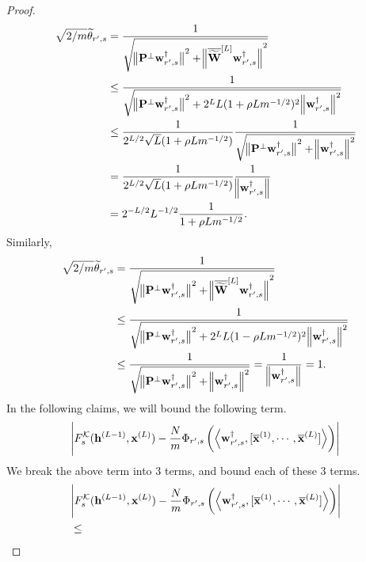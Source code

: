 \begin{claim}
\begin{proof}
				\begin{align}
					\sqrt{2/m} \widetilde{\theta}_{r', s} &= \frac{1}{\sqrt{ \norm[1]{\mathbf{P}^{\perp}\mathbf{w}_{r', s}^{\dagger}}^2 + \norm[2]{\overline{\widetilde{\mathbf{W}}}^{[L]} \mathbf{w}_{r', s}^{\dagger}}^2 }}\nonumber\\&
					\le \frac{1}{\sqrt{  \norm[1]{\mathbf{P}^{\perp}\mathbf{w}_{r', s}^{\dagger}}^2 + 2^{L} L (1 + \rho L m^{-1/2})^2\norm[2]{ \mathbf{w}_{r', s}^{\dagger}}^2 }} \nonumber\\&
					\le \frac{1}{2^{L/2} \sqrt{L} (1 + \rho L m^{-1/2})} \frac{1}{\sqrt{  \norm[1]{\mathbf{P}^{\perp}\mathbf{w}_{r', s}^{\dagger}}^2 + \norm[2]{ \mathbf{w}_{r', s}^{\dagger}}^2 }} \nonumber \\&
					=  \frac{1}{2^{L/2} \sqrt{L} (1 + \rho L m^{-1/2})} \frac{1}{\norm{\mathbf{w}_{r', s}^{\dagger}}} \nonumber\\&
					= 2^{-L/2} L^{-1/2} \frac{1}{1 + \rho L m^{-1/2}} \label{eq:abstildetheta_lowerbound}.
				\end{align}
				Similarly,
				\begingroup
				\allowdisplaybreaks
				\begin{align}
					\sqrt{2/m} \widetilde{\theta}_{r', s} &= \frac{1}{\sqrt{ \norm[1]{\mathbf{P}^{\perp}\mathbf{w}_{r', s}^{\dagger}}^2 + \norm[2]{\overline{\widetilde{\mathbf{W}}}^{[L]} \mathbf{w}_{r', s}^{\dagger}}^2 }}\nonumber\\&
					\le \frac{1}{\sqrt{  \norm[1]{\mathbf{P}^{\perp}\mathbf{w}_{r', s}^{\dagger}}^2 + 2^{L} L (1 - \rho L m^{-1/2})^2\norm[2]{ \mathbf{w}_{r', s}^{\dagger}}^2 }} \nonumber\\&
					\le  \frac{1}{\sqrt{  \norm[1]{\mathbf{P}^{\perp}\mathbf{w}_{r', s}^{\dagger}}^2 + \norm[2]{ \mathbf{w}_{r', s}^{\dagger}}^2 }} 
					=   \frac{1}{\norm{\mathbf{w}_{r', s}^{\dagger}}}
					= 1. \label{eq:abstildetheta_upperbound}
				\end{align}
				\endgroup
				In the following claims, we will bound the following term.
				\begin{align*}
					\abs{F^{\mathcal{K}}_s(\mathbf{h}^{(L-1)}, \mathbf{x}^{(L)}) -\frac{N}{m} \Phi_{r', s} \left(\left\langle \mathbf{w}_{r', s}^{\dagger}, [\overline{\mathbf{x}}^{(1)}, \cdots, \overline{\mathbf{x}}^{(L)}]\right\rangle\right)}
				\end{align*}
				We break the above term into 3 terms, and bound each of these 3 terms.
				\begin{align}
					&\abs{F^{\mathcal{K}}_s(\mathbf{h}^{(L-1)}, \mathbf{x}^{(L)}) -\frac{N}{m} \Phi_{r', s} \left(\left\langle \mathbf{w}_{r', s}^{\dagger}, [\overline{\mathbf{x}}^{(1)}, \cdots, \overline{\mathbf{x}}^{(L)}]\right\rangle\right)} \nonumber\\&\le

\end{align}
\end{proof}
\end{claim}
